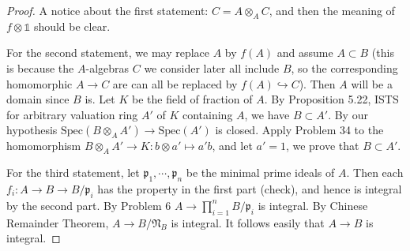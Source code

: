 \documentclass{solution}
\begin{document}
\begin{proof}
    A notice about the first statement: $C = A \otimes_A C$, and then the meaning of $f \otimes \mathds{1}$ should be clear.

    For the second statement, we may replace $A$ by $f(A)$ and assume $A \subset B$ (this is because the $A$-algebras $C$ we consider later all include $B$, so the corresponding homomorphic $A \rightarrow C$ are can all be replaced by $f(A) \hookrightarrow C$). Then $A$ will be a domain since $B$ is. Let $K$ be the field of fraction of $A$. By Proposition 5.22, ISTS for arbitrary valuation ring $A'$ of $K$ containing $A$, we have $B \subset A'$. By our hypothesis $\mathrm{Spec}(B \otimes_A A') \rightarrow \mathrm{Spec}(A')$ is closed. Apply Problem 34 to the homomorphism $B \otimes_A A' \rightarrow K: b \otimes a' \mapsto a'b$, and let $a' = 1$, we prove that $B \subset A'$.

    For the third statement, let $\mathfrak{p}_1, \cdots, \mathfrak{p}_n$ be the minimal prime ideals of $A$. Then each $f_i: A \rightarrow B \rightarrow B / \mathfrak{p}_i$ has the property in the first part (check), and hence is integral by the second part. By Problem 6 $A \rightarrow \prod\limits_{i = 1}^{n} B / \mathfrak{p}_i$ is integral. By Chinese Remainder Theorem, $A \rightarrow B / \mathfrak{N}_B$ is integral. It follows easily that $A \rightarrow B$ is integral.
\end{proof}
\end{document}
